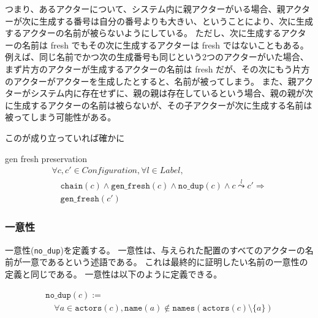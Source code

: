 つまり、あるアクターについて、システム内に親アクターがいる場合、親アクターが次に生成する番号は自分の番号よりも大きい、ということにより、次に生成するアクターの名前が被らないようにしている。
ただし、次に生成するアクターの名前は fresh でもその次に生成するアクターは fresh ではないこともある。
例えば、同じ名前でかつ次の生成番号も同じという2つのアクターがいた場合、まず片方のアクターが生成するアクターの名前は fresh だが、その次にもう片方のアクターがアクターを生成したとすると、名前が被ってしまう。
また、親アクターがシステム内に存在せずに、親の親は存在しているという場合、親の親が次に生成するアクターの名前は被らないが、その子アクターが次に生成する名前は被ってしまう可能性がある。

このが成り立っていれば確かに


\begin{lemma}{gen fresh preservation}
\begin{displaymath}
  \begin{array}{l}
    \forall c, c' \in \textit{Configuration}, \forall l \in \textit{Label}, \\
    \quad \texttt{chain}(c) \wedge \texttt{gen\_fresh}(c) \wedge \texttt{no\_dup}(c) \wedge c \overset{l}{\leadsto} c' \Rightarrow \\
    \quad \texttt{gen\_fresh}(c')
  \end{array}
\end{displaymath}
\end{lemma}

\subsubsection{一意性}

一意性(\texttt{no\_dup})を定義する。
一意性は、与えられた配置のすべてのアクターの名前が一意であるという述語である。
これは最終的に証明したい名前の一意性の定義と同じである。
一意性は以下のように定義できる。

\begin{displaymath}
  \begin{array}{l}
    \texttt{no\_dup}(c) := \\
    \quad \forall a \in \texttt{actors}(c), \texttt{name}(a) \notin
    \texttt{names}(\texttt{actors}(c) \setminus \{a\})
  \end{array}
\end{displaymath}

